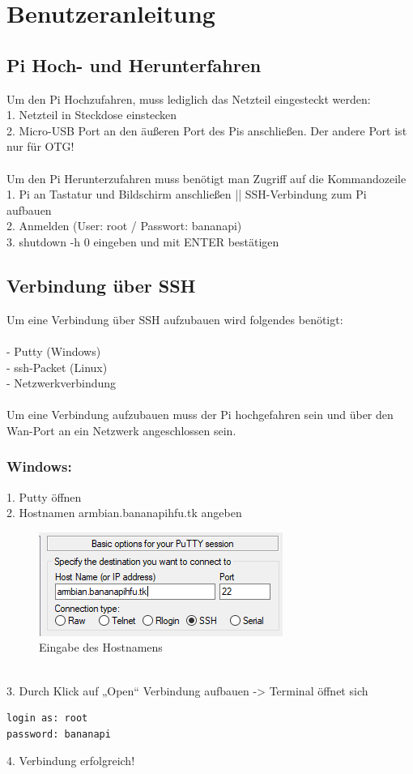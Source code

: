 \chapter{Benutzeranleitung}
\section{Pi Hoch- und Herunterfahren}
Um den Pi Hochzufahren, muss lediglich das Netzteil eingesteckt werden:\\
1. Netzteil in Steckdose einstecken\\
2. Micro-USB Port an den äußeren Port des Pis anschließen. Der andere Port ist nur für OTG!\\
~\\
Um den Pi Herunterzufahren muss benötigt man Zugriff auf die Kommandozeile\\
1. Pi an Tastatur und Bildschirm anschließen || SSH-Verbindung zum Pi aufbauen\\
2. Anmelden (User: root / Passwort: bananapi)\\
3. shutdown -h 0 eingeben und mit ENTER bestätigen\\

\section{Verbindung über SSH}
Um eine Verbindung über SSH aufzubauen wird folgendes benötigt:\\
~\\
- Putty (Windows)\\
- ssh-Packet (Linux)\\
- Netzwerkverbindung\\
~\\
Um eine Verbindung aufzubauen muss der Pi hochgefahren sein und über den Wan-Port an ein Netzwerk angeschlossen sein.
\newpage
\subsection*{Windows:}
1. Putty öffnen\\
2. Hostnamen armbian.bananapihfu.tk angeben
\begin{figure}[ht]
\centering
\includegraphics[width=.7\textwidth]{pictures/Jonas/Anleitung/BILD1}
\caption{Eingabe des Hostnamens}
\end{figure}
~\\3. Durch Klick auf „Open“ Verbindung aufbauen -> Terminal öffnet sich
\begin{lstlisting}
login as: root
password: bananapi
\end{lstlisting}
4. Verbindung erfolgreich!

